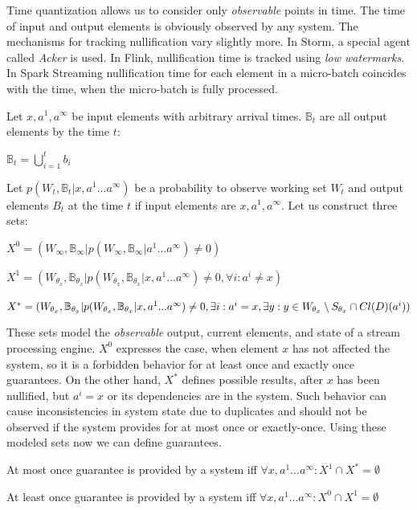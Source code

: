 Time quantization allows us to consider only {\em observable} points in time. The time of input and output elements is obviously observed by any system. The mechanisms for tracking nullification vary slightly more. In Storm, a special agent called {\em Acker} is used. In Flink, nullification time is tracked using {\em low watermarks}. In Spark Streaming nullification time for each element in a micro-batch coincides with the time, when the micro-batch is fully processed.

Let $x,a^{1},a^\infty$ be input elements with arbitrary arrival times. $\mathbb{B}_t$ are all output elements by the time $t$:

$\mathbb{B}_t=\bigcup\limits_{i=1}^{t}{b_i}$

Let $p(W_t,\mathbb{B}_t|x,a^{1}...a^\infty)$ be a probability to observe working set $W_t$ and output elements $B_t$ at the time $t$ if input elements are $x,a^{1},a^\infty$. Let us construct three sets:

$X^0=(W_\infty,\mathbb{B}_\infty|p(W_\infty,\mathbb{B}_\infty|a^{1}...a^\infty)\neq{0})$

$X^1=(W_{\theta_{x}},\mathbb{B}_{\theta_{x}}|p(W_{\theta_{x}},\mathbb{B}_{\theta_{x}}|x,a^{1}...a^\infty)\neq{0},\forall{i}:{a^i}\neq{x})$

$X^{*}=(W_{\theta_{x}},\mathbb{B}_{\theta_{x}}|p(W_{\theta_{x}},\mathbb{B}_{\theta_{x}}|x,a^{1}...a^\infty)\neq{0},\\
\exists{i}:{a^i={x}},\exists{y:y\in{W_{\theta_{x}}\setminus{S_{\theta_x}}}\cap{Cl(D)(a^i)}})$

These sets model the {\em observable} output, current elements, and state of a stream processing engine. $X^0$ expresses the case, when element $x$ has not affected the system, so it is a forbidden behavior for at least once and exactly once guarantees. On the other hand, $X^{*}$ defines possible results, after $x$ has been nullified, but $a^i=x$ or its dependencies are in the system. Such behavior can cause inconsistencies in system state due to duplicates and should not be observed if the system provides for at most once or exactly-once. Using these modeled sets now we can define guarantees.

\begin{definition}{At most once}
guarantee is provided by a system iff $\forall{x,a^{1}...a^\infty}:X^{1}\cap{X^{*}}=\emptyset$
\end{definition}

\begin{definition}{At least once}
guarantee is provided by a system iff $\forall{x,a^{1}...a^\infty}:X^{0}\cap{X^{1}}=\emptyset$
\end{definition}

